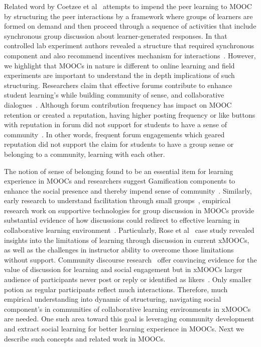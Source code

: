 \documentclass[manuscript,screen,review]{acmart}
\begin{document}
Related word by Coetzee et al~\cite{coetzee2015structuring} attempts to impend the peer learning to MOOC by structuring the peer interactions by a framework where groups of learners are formed on demand and then proceed through a sequence of activities that include synchronous group discussion about learner-generated responses. In that controlled lab experiment authors revealed a structure that required synchronous component and also recommend incentives mechanism for interactions~\cite{coetzee2015structuring}. However, we highlight that MOOCs in nature is different to online learning and field experiments are important to understand the in depth implications of such structuring. Researchers claim that effective forums contribute to enhance student learning's while building community of sense, and collaborative dialogues~\cite{luca2004using}. Although forum contribution frequency has impact on MOOC retention or created a reputation, having higher posting frequency or like buttons with reputation in forum did not support for students to have a sense of community~\cite{coetzee2014should}. In other words, frequent forum engagements which geared reputation did not support the claim for students to have a group sense or belonging to a community, learning with each other.

The notion of sense of belonging found to be an essential item for learning experience in MOOCs and researchers suggest Gamification components to enhance the social presence and thereby impend sense of community~\cite{antonaci2019gamification}. Similarly, early research to understand facilitation through small groups~\cite{lim2014initial}, empirical research work on supportive technologies for group discussion in MOOCs provide substantial evidence of how discussions could redirect to effective learning in collaborative learning environment~\cite{rose2015supportive}. Particularly, Rose et al~\cite{rose2015supportive} case study revealed insights into the limitations of learning through discussion in current xMOOCs, as
well as the challenges in instructor ability to overcome those limitations without support. Community discourse research~\cite{mitchell2011profound,resnick2015socializing} offer convincing evidence for the value of discussion for learning and social engagement but in xMOOCs larger audience of participants never post or reply or identified as likers~\cite{ferguson2015examining,clow2013moocs}. Only smaller potion as regular participants reflect much interactions. Therefore, much empirical understanding into dynamic of structuring, navigating social component's in communities of collaborative learning environments in xMOOCs are needed. One such area toward this goal is leveraging community development and extract social learning for better learning experience in MOOCs. Next we describe such concepts and related work in MOOCs.
\end{document}
